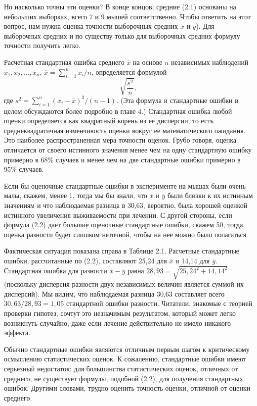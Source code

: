 Но насколько точны эти оценки? В конце концов, средние (2.1) основаны на небольших выборках, всего 7 и 9 мышей соответственно. Чтобы ответить на этот вопрос, нам нужна оценка точности выборочных средних $\overline x$ и $\overline y$). Для выборочных средних и по существу только для выборочных средних формулу точности получить легко. 

Расчетная стандартная ошибка среднего $\overline x$ на основе $n$ независимых наблюдений $x_1, x_2,\ldots, x_n$, $\overline x =\sum_{i=1}^n x_i/n$, определяется формулой 
\begin{equation}
    \sqrt{\frac{s^2}{n}},
\end{equation}
где $s^2=\sum_{i=1}^n (x_i-\overline x)^2/(n-1)$. (Эта формула и стандартные ошибки в целом обсуждаются более подробно в главе 4.) Стандартная ошибка любой оценки определяется как квадратный корень из ее дисперсии, то есть среднеквадратичная изменчивость оценки вокруг ее математического ожидания. Это наиболее распространенная мера точности оценок. Грубо говоря, оценка отличается от своего истинного значения менее чем на одну стандартную ошибку примерно в 68\% случаев и менее чем на две стандартные ошибки примерно в 95\% случаев.

Если бы оценочные стандартные ошибки в эксперименте на мышах были очень малы, скажем, менее 1, тогда мы бы знали, что $\overline x$ и $\overline y$ были близки к их истинным значениям и что наблюдаемая разница в 30,63, вероятно, была хорошей оценкой истинного увеличения выживаемости при лечении. С другой стороны, если формула (2.2) дает большие оценочные стандартные ошибки, скажем 50, тогда оценка разности будет слишком неточной, чтобы на нее можно было полагаться. 

Фактическая ситуация показана справа в Таблице 2.1. Расчетные стандартные ошибки, рассчитанные по (2.2), составляют 25,24 для $\overline x$ и 14,14 для $\overline y$. Стандартная ошибка для разности $\overline x - \overline y$ равна $28,93 = \sqrt{25,24^2 + 14,14^2}$ (поскольку дисперсия разности двух независимых величин является суммой их дисперсий). Мы видим, что наблюдаемая разница 30,63 составляет всего $30,63 / 28,93 = 1,05$ стандартной ошибки разности. Читатели, знакомые с теорией проверки гипотез, сочтут это незначимым результатом, который может легко возникнуть случайно, даже если лечение действительно не имело никакого эффекта. 

Обычно стандартные ошибки являются отличным первым шагом к критическому осмыслению статистических оценок. К сожалению, стандартные ошибки имеют серьезный недостаток: для большинства статистических оценок, отличных от среднего, не существует формулы, подобной (2.2), для получения стандартных ошибок. Другими словами, трудно оценить точность оценки, отличной от оценки среднего.

